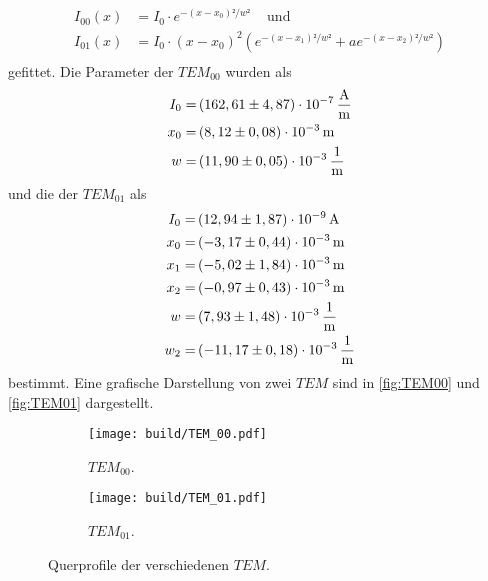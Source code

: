 \begin{align*}
    I_{00}(x) &= I_0 \cdot e^{-(x-x_0)²/w ²} \, \quad \text{und} \\
    I_{01}(x) &= I_0 \cdot (x-x_{0})^2 \left( e^{-(x-x_1)²/w ²} + a e^{-(x-x_2)²/w ²} \right) \\
\end{align*}
gefittet.
Die Parameter der $TEM_{00}$  wurden als 
\begin{align*}
   I_0 =& \left( 162,61 \pm 4,87 \right) \cdot 10^{-7} \, \dfrac{\unit{\ampere}}{\unit{\meter}} \\
   x_0 =& \left( 8,12   \pm 0,08 \right) \cdot 10^{-3} \, \unit{\meter}                         \\
   w   =& \left(11,90   \pm 0,05 \right) \cdot 10^{-3} \, \unit{\dfrac{1}{\meter}}              \\
\end{align*}
und die der $TEM_{01}$ als
\begin{align*}
    I_0 =& \left( 12,94  \pm 1,87 \right) \cdot 10^{-9} \, \unit{\ampere}           \\
    x_0 =& \left( -3,17  \pm 0,44 \right) \cdot 10^{-3} \, \unit{\meter}            \\
    x_1 =& \left( -5,02  \pm 1,84 \right) \cdot 10^{-3} \, \unit{\meter}            \\
    x_2 =& \left( -0,97  \pm 0,43 \right) \cdot 10^{-3} \, \unit{\meter}            \\
    w   =& \left(  7,93  \pm 1,48 \right) \cdot 10^{-3} \, \unit{\dfrac{1}{\meter}} \\
    w_2 =& \left(-11,17  \pm 0,18 \right) \cdot 10^{-3} \, \unit{\dfrac{1}{\meter}} \\
 \end{align*}
 bestimmt. Eine grafische Darstellung von zwei $TEM$ sind in \autoref{fig:TEM00} und \autoref{fig:TEM01} dargestellt.

 \begin{figure}[H]
    \centering
    \begin{subfigure}[b]{0.49\textwidth}
        \centering
        \texttt{[image: build/TEM\_00.pdf]}
        \caption{$TEM_{00}$.}
        \label{fig:TEM00}
    \end{subfigure}
    \hfill
    \begin{subfigure}[b]{0.49\textwidth}
        \centering
        \texttt{[image: build/TEM\_01.pdf]}
        \caption{$TEM_{01}$.}
        \label{fig:TEM01}
    \end{subfigure}
    \caption{Querprofile der verschiedenen $TEM$.}
\end{figure}


